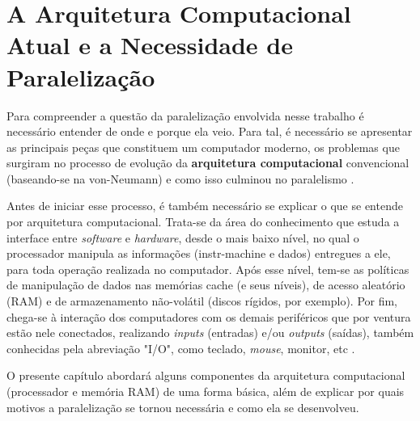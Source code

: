 
\chapter{A Arquitetura Computacional Atual e a Necessidade de Paralelização}

Para compreender a questão da paralelização envolvida nesse trabalho é
necessário entender de onde e porque ela veio. Para tal, é necessário
se apresentar as principais peças que constituem um computador moderno,
os problemas que surgiram no processo de evolução da \textbf{arquitetura
computacional} convencional (baseando-se na \gls{von-Neumann}) e como isso culminou no 
paralelismo \cite{LLNL:parcomp}.

Antes de iniciar esse processo, é também necessário se explicar o que se
entende por arquitetura computacional. Trata-se da área do conhecimento
que estuda a interface entre \textit{software} e \textit{hardware}, desde
o mais baixo nível, no qual o processador manipula as informações
(\gls{instr-machine} e dados) entregues a ele, para toda operação realizada no
computador. Após esse nível, tem-se as políticas de manipulação de dados nas memórias
cache (e seus níveis), de acesso aleatório (\acrshort{RAM}) e de 
armazenamento não-volátil (discos rígidos, por exemplo).
Por fim, chega-se à interação dos computadores com os demais periféricos que
por ventura estão nele conectados, realizando \textit{inputs} (entradas)
e/ou \textit{outputs} (saídas), também conhecidas pela abreviação "I/O",
como teclado, \textit{mouse}, monitor, etc \cite{Catsoulis}.

O presente capítulo abordará alguns componentes da arquitetura computacional 
(processador e memória \acrshort{RAM}) de uma forma básica, além de explicar por quais 
motivos a paralelização se tornou necessária e como ela se desenvolveu.







